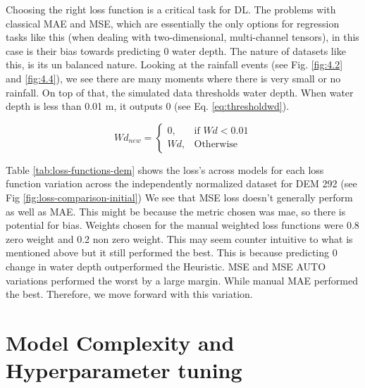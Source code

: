 Choosing the right loss function is a critical task for DL. The problems with classical MAE and MSE, which are essentially the only options for regression tasks like this (when dealing with two-dimensional, multi-channel tensors), in this case is their bias towards predicting 0 water depth. The nature of datasets like this, is its un balanced nature. Looking at the rainfall events (see Fig. \ref{fig:4.2} and \ref{fig:4.4}), we see there are many moments where there is very small or no rainfall. On top of that, the simulated data thresholds water depth. When water depth is less than 0.01 m, it outputs 0 (see Eq. \ref{eq:thresholdwd}).

\begin{equation}
	\label{eq:thresholdwd}
	Wd_{new} = \begin{cases}
		0, & \text{if } Wd < 0.01 \\
		Wd, & \text{Otherwise}
	\end{cases}
\end{equation}

Table \ref{tab:loss-functions-dem} shows the loss's across models for each loss function variation across the independently normalized dataset for DEM 292 (see Fig \ref{fig:loss-comparison-initial}) We see that MSE loss doesn't generally perform as well as MAE. This might be because the metric chosen was mae, so there is potential for bias. Weights chosen for the  manual weighted loss functions were 0.8 zero weight and 0.2 non zero weight. This may seem counter intuitive to what is mentioned above but it still performed the best. This is because predicting 0 change in water depth outperformed the Heuristic. MSE and MSE AUTO variations performed the worst by a large margin. While manual MAE performed the best. Therefore, we move forward with this variation.

\section{Model Complexity and Hyperparameter tuning}

